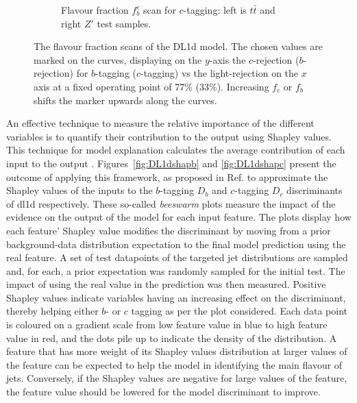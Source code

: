 \begin{figure}[h!]
\begin{subfigure}[b]{\textwidth}
    \caption{Flavour fraction $f_b^c$ scan for $c$-tagging: left is $t\bar{t}$ and right $Z'$ test samples.} 
    \label{fig:DL1dscanfc}
\end{subfigure}
  \caption{The flavour fraction scans of the DL1d model. The chosen values are marked on the curves, displaying on the $y$-axis the $c$-rejection ($b$-rejection) for $b$-tagging ($c$-tagging) vs the light-rejection on the $x$ axis at a fixed operating point of 77\% (33\%). Increasing $f_c$ or $f_b$ shifts the marker upwards along the curves. }
  \label{fig:DL1dscanf}
\end{figure} 

An effective technique to measure the relative importance of the different variables is to quantify their contribution to the output using Shapley values. This technique for model explanation calculates the average contribution of each input to the output \cite{Rozemberczki2022TheSV}. Figures~\ref{fig:DL1dshapb} and \ref{fig:DL1dshapc} present the outcome of applying this framework, as proposed in Ref. \cite{NIPS2017_7062} to approximate the Shapley values of the inputs to the $b$-tagging $D_b$ and $c$-tagging $D_c$ discriminants of \gls{dl1d} respectively. These so-called \textit{beeswarm} plots measure the impact of the evidence on the output of the model for each input feature. The plots display how each feature' Shapley value modifies the discriminant by moving from a prior background-data distribution expectation to the final model prediction using the real feature. A set of test datapoints of the targeted jet distributions are sampled and, for each, a prior expectation was randomly sampled for the initial test. The impact of using the real value in the prediction was then measured. Positive Shapley values indicate variables having an increasing effect on the discriminant, thereby helping either $b$- or $c$ tagging as per the plot considered. Each data point is coloured on a gradient scale from low feature value in blue to high feature value in red, and the dots pile up to indicate the density of the distribution. A feature that has more weight of its Shapley values distribution at larger values of the feature can be expected to help the model in identifying the main flavour of jets. Conversely, if the Shapley values are negative for large values of the feature, the feature value should be lowered for the model discriminant to improve.


